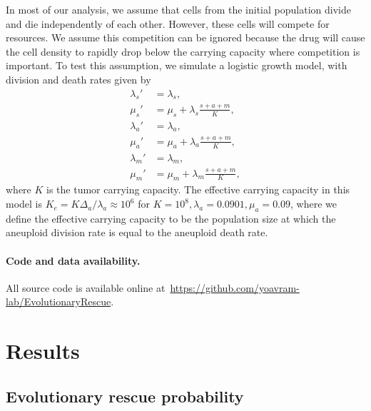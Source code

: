 \documentclass[12pt]{extarticle}
\begin{document}
In most of our analysis, we assume that cells from the initial population divide and die independently of each other. 
However, these cells will compete for resources. 
We assume this competition can be ignored because the drug will cause the cell density to rapidly drop below the carrying capacity where competition is important.
To test this assumption, we simulate a logistic growth model, with division and death rates given by
\[
\begin{aligned}
\lambda_s' &= \lambda_s , \\
\mu_s' &= \mu_s + \lambda_s\frac{s+a+m}{K},\\
\lambda_a' &= \lambda_a ,\\ 
\mu_a' &= \mu_a + \lambda_a\frac{s+a+m}{K} ,\\
\lambda_m' &= \lambda_m ,\\ 
\mu_m' &= \mu_m + \lambda_m\frac{s+a+m}{K} ,
\end{aligned}
\]
where $K$ is the tumor carrying capacity. 
The effective carrying capacity in this model is $K_e=K\Delta_a/\lambda_a\approx10^6$ for $K=10^8, \lambda_a=0.0901,\mu_a=0.09$, where we define the effective carrying capacity to be the population size at which the aneuploid division rate is equal to the aneuploid death rate. 


\paragraph{Code and data availability.} All source code is available online at~\url{https://github.com/yoavram-lab/EvolutionaryRescue}.


\section*{Results}


\subsection*{Evolutionary rescue probability}
\end{document}

